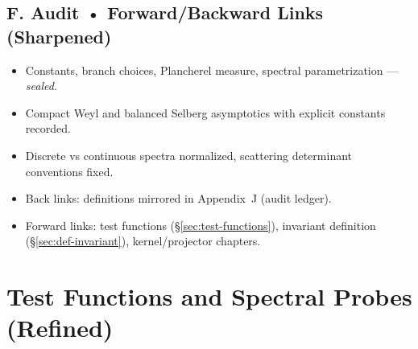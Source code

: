 
\subsection*{F. Audit • Forward/Backward Links (Sharpened)}
\label{subsec:audit-links-sharp}

\begin{tcolorbox}[colback=gray!3,colframe=gray!65,title=Audit outcome — Part 1/5 (sealed)]
\begin{itemize}
  \item Constants, branch choices, Plancherel measure, spectral parametrization — \emph{sealed}.
  \item Compact Weyl and balanced Selberg asymptotics with explicit constants recorded.
  \item Discrete vs continuous spectra normalized, scattering determinant conventions fixed.
  \item Back links: definitions mirrored in Appendix~J (audit ledger).
  \item Forward links: test functions (\S\ref{sec:test-functions}), invariant definition (\S\ref{sec:def-invariant}), kernel/projector chapters.
\end{itemize}
\end{tcolorbox}


\section{Test Functions and Spectral Probes (Refined)}
\label{sec:test-functions-sharp}

